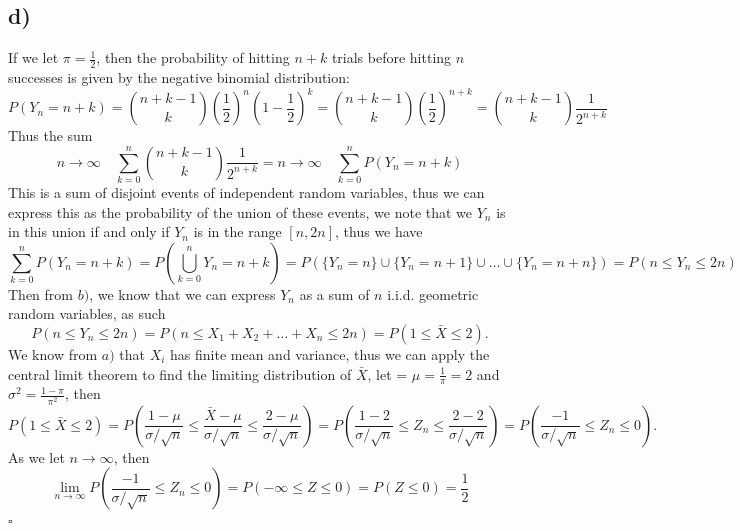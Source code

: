 \documentclass{article}
\theoremstyle{definition}
\theoremstyle{remark}
\begin{document}
\subsection*{d)}
If we let $\pi = \frac{1}{2}$, then the probability of hitting $n+k$ trials before hitting $n$ successes is given by the negative binomial distribution:
\begin{equation}
    P(Y_n = n + k) = \binom{n + k - 1}{k} \left(\frac{1}{2}\right)^n \left(1 - \frac{1}{2}\right)^k = \binom{n + k - 1}{k} \left(\frac{1}{2}\right)^{n + k} = \binom{n + k - 1}{k} \frac{1}{2^{n+k}}
\end{equation}
Thus the sum
$$ n \to \infty\quad \sum_{k=0}^{n}\binom{n + k - 1}{k} \frac{1}{2^{n+k}} = n \to \infty\quad \sum_{k=0}^{n}P(Y_n = n + k)$$
This is a sum of disjoint events of independent random variables, thus we can express this as the probability of the union of these events, we note that we $Y_n$ is in this union if and only if $Y_n$ is in the range $[n, 2n]$, thus we have
\begin{equation}
    \sum_{k=0}^{n}P(Y_n = n + k) = P(\bigcup_{k=0}^{n}Y_n = n + k) =P(\{Y_n = n\} \cup \{Y_n = n + 1\} \cup \ldots \cup \{Y_n = n + n\}) = P(n \leq Y_n \leq 2n)
\end{equation}
Then from $b)$, we know that we can express $Y_n$ as a sum of $n$ i.i.d. geometric random variables, as such
\begin{equation}
    P(n \leq Y_n \leq 2n) = P( n \leq X_1 + X_2 + \ldots + X_n \leq 2n) = P(1 \leq \bar{X} \leq 2).
\end{equation}
We know from $a)$ that $X_i$ has finite mean and variance, thus we can apply the central limit theorem to find the limiting distribution of $\bar{X}$, let = $\mu = \frac{1}{\pi} = 2$ and $\sigma^2 = \frac{1 - \pi}{\pi^2}$, then
\begin{equation}
    P(1 \leq \bar{X} \leq 2) = P\left(\frac{1 - \mu}{\sigma/\sqrt{n}} \leq \frac{\bar{X} - \mu}{\sigma/\sqrt{n}} \leq \frac{2 - \mu}{\sigma/\sqrt{n}}\right) = P\left(\frac{1 - 2}{\sigma/\sqrt{n}} \leq Z_n \leq \frac{2 - 2}{\sigma/\sqrt{n}}\right) = P\left(\frac{-1}{\sigma/\sqrt{n}} \leq Z_n \leq 0\right).
\end{equation}
As we let $n \to \infty$, then
\begin{equation}
    \lim_{n \to \infty} P\left(\frac{-1}{\sigma/\sqrt{n}} \leq Z_n \leq 0\right) = P(-\infty \leq Z \leq 0) = P(Z \leq 0) = \dfrac{1}{2}
\end{equation}
$\square$
\end{document}
